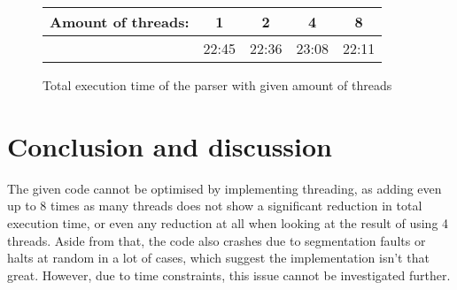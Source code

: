 \documentclass{sig-alternate-05-2015}
\begin{document}
\begin{figure}[h!]
 \begin{tabular}{l|c|c|c|c}
  Amount of threads: & 1 & 2 & 4 & 8 \\
   \hline
   & 22:45 & 22:36 & 23:08 & 22:11 \\
 \end{tabular}
 \caption{Total execution time of the parser with given amount of threads}
 \label{threadtable}
\end{figure}
\FloatBarrier

\section{Conclusion and discussion}
The given code cannot be optimised by implementing threading, as adding even up to 8 times as many threads does not show a significant reduction in total execution time, or even any reduction at all when looking at the result of using 4 threads. Aside from that, the code also crashes due to segmentation faults or halts at random in a lot of cases, which suggest the implementation isn't that great. However, due to time constraints, this issue cannot be investigated further.
\end{document}
